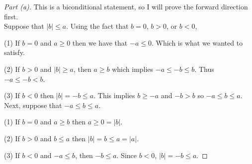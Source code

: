 \documentclass[leqno]{article}
\theoremstyle{nonumberplain}
\newtheorem{proof}{Proof}
\begin{document}
\begin{proof}[Part (a)]
This is a biconditional statement, so I will prove the forward direction first.  \\

Suppose that $|b| \leq a$.  Using the fact that $b=0$, $b>0$, or $b<0$,

(1) If $b=0$ and $a\geq 0$ then we have that $-a \leq 0$. Which is what we wanted to satisfy.

(2) If $b>0$ and $|b| \geq a$, then $a\geq b$ which implies $-a \leq -b \leq b$.  Thus $-a \leq -b < b$.

(3) If $b<0$ then $|b|=-b \leq a$.  This implies $b \geq -a$ and $-b > b$ so $-a \leq b \leq a$. \\ 

Next, suppose that $-a \leq b \leq a$.  

(1) If $b=0$ and $a \geq b$ then $a\geq 0 = |b|$.

(2) If $b>0$ and $b \leq a$ then $|b|=b\leq a = |a|$.

(3) If $b<0$ and $-a \leq b$, then $-b \leq a$. Since $b<0$, $|b| = -b \leq a$.
\end{proof}
\end{document}
